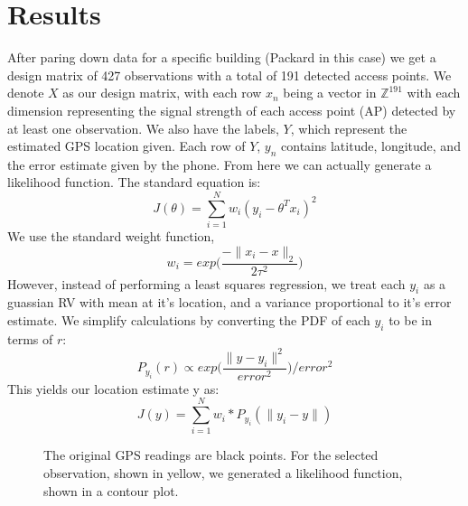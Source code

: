 \section{Results}
After paring down data for a specific building (Packard in this case)
we get a design matrix of 427 observations with a total of 191 detected
access points. We denote $X$ as our design matrix, with each row 
$x_n$ being a vector in $\mathbb{Z}^191$ with each dimension representing
the signal strength of each access point (AP) detected by at least 
one observation.  We also have the labels, $Y$, which represent the 
estimated GPS location given. Each row of $Y$, $y_n$ contains latitude,
longitude, and the error estimate given by the phone.  From here we can actually
generate a likelihood function. The standard equation is:
\begin{equation}
    J(\theta)= \sum_{i=1}^{N} w_i(y_i - \theta^T x_i)^2
\end{equation}
We use the standard weight function, 
\begin{equation} 
    w_i = exp \Bigg( \frac {-\| x_i - x \|_2} {2 \tau^2} \Bigg)
\end{equation}
However, instead of performing a least squares regression, 
we treat each $y_i$ as a guassian RV with mean at it's location, and 
a variance proportional to it's error estimate. We simplify calculations
by converting the PDF of each $y_i$ to be in terms of $r$:
\begin{equation} 
    P_{y_i}(r) \propto exp \Bigg( \frac{\| y - y_i \|^2} {error^2} \Bigg) / error^2
\end{equation}
This yields our location estimate y as:
\begin{equation}
    J(y)= \sum_{i=1}^{N} w_i * P_{y_i}(\|y_i - y\|)
\end{equation}

\begin{figure}
\caption{The original GPS readings are black points. For the selected
observation, shown in yellow, we generated a likelihood function, shown in a contour plot.}
\end{figure}


